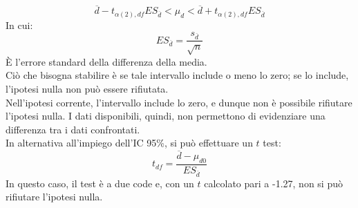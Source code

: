\documentclass[10pt, draft]{book}
\newcounter{example}[section]
\begin{document}
\begin{example}
\begin{equation}
        \overline{d}-t_{\alpha(2),df}ES_{\overline{d}}<\mu_d<\overline{d}+t_{\alpha(2),df}ES_{\overline{d}}
    \end{equation}
    In cui:
    \begin{equation}
        ES_{\overline{d}} = \frac{s_{\overline{d}}}{\sqrt{n}}
    \end{equation}
    È l'errore standard della differenza della media.
    \\
    Ciò che bisogna stabilire è se tale intervallo include o meno lo zero; se lo include, l'ipotesi nulla non può essere rifiutata.
    \\
    Nell'ipotesi corrente, l'intervallo include lo zero, e dunque non è possibile rifiutare l'ipotesi nulla. I dati disponibili, quindi, non permettono di evidenziare una differenza tra i dati confrontati.
    \\
    In alternativa all'impiego dell'IC 95\%, si può effettuare un $t$ test:
    \begin{equation}
        t_{df} = \frac{\overline{d}-\mu_{d0}}{ES_{\overline{d}}}
    \end{equation}
    In questo caso, il test è a due code e, con un $t$ calcolato pari a -1.27, non si può rifiutare l'ipotesi nulla.
\end{example}
\end{document}
